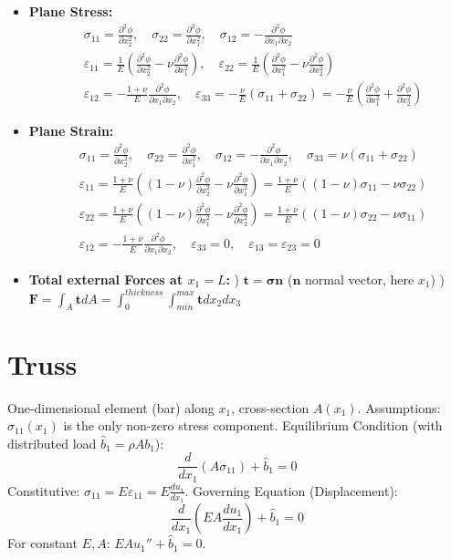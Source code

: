 \documentclass[10pt,twocolumn, a4paper]{article}
\begin{document}
\begin{itemize}
    \item \textbf{Plane Stress:}
    \begin{align*}
        &\sigma_{11} = \frac{\partial^2 \phi}{\partial x_2^2}, \quad \sigma_{22} = \frac{\partial^2 \phi}{\partial x_1^2}, \quad \sigma_{12} = -\frac{\partial^2 \phi}{\partial x_1 \partial x_2} \\
        &\varepsilon_{11} = \frac{1}{E}\left(\frac{\partial^2 \phi}{\partial x_2^2} - \nu \frac{\partial^2 \phi}{\partial x_1^2}\right), \quad \varepsilon_{22} = \frac{1}{E}\left(\frac{\partial^2 \phi}{\partial x_1^2} - \nu \frac{\partial^2 \phi}{\partial x_2^2}\right) \\
        &\varepsilon_{12} = -\frac{1+\nu}{E} \frac{\partial^2 \phi}{\partial x_1 \partial x_2}, \quad \varepsilon_{33} = -\frac{\nu}{E}(\sigma_{11} + \sigma_{22}) = -\frac{\nu}{E} \left(\frac{\partial^2 \phi}{\partial x_1^2} + \frac{\partial^2 \phi}{\partial x_2^2}\right)
    \end{align*}
    \item \textbf{Plane Strain:}
    \begin{align*}
        &\sigma_{11} = \frac{\partial^2 \phi}{\partial x_2^2}, \quad \sigma_{22} = \frac{\partial^2 \phi}{\partial x_1^2}, \quad \sigma_{12} = -\frac{\partial^2 \phi}{\partial x_1 \partial x_2}, \quad \sigma_{33} = \nu(\sigma_{11} + \sigma_{22}) \\
        &\varepsilon_{11} = \frac{1+\nu}{E}\left((1-\nu)\frac{\partial^2 \phi}{\partial x_2^2} - \nu \frac{\partial^2 \phi}{\partial x_1^2}\right) = \frac{1+\nu}{E} ((1-\nu)\sigma_{11} - \nu \sigma_{22}) \\
        &\varepsilon_{22} = \frac{1+\nu}{E}\left((1-\nu)\frac{\partial^2 \phi}{\partial x_1^2} - \nu \frac{\partial^2 \phi}{\partial x_2^2}\right) = \frac{1+\nu}{E} ((1-\nu)\sigma_{22} - \nu \sigma_{11}) \\
        &\varepsilon_{12} = -\frac{1+\nu}{E} \frac{\partial^2 \phi}{\partial x_1 \partial x_2}, \quad \varepsilon_{33} = 0, \quad \varepsilon_{13} = \varepsilon_{23} = 0
    \end{align*}
    \item \textbf{Total external Forces at $x_1=L$:} 
    ) $\bm{t} = \bm{\sigma} \bm{n}$ ($\bm{n}$ normal vector, here $x_1$) 
    ) $\bm{F} = \int_A \bm{t}dA = \int_0^{thickness} \int_{min}^{max} \bm{t} dx_2dx_3$
\end{itemize}

\section{Truss}
One-dimensional element (bar) along $x_1$, cross-section $A(x_1)$.
Assumptions: $\sigma_{11}(x_1)$ is the only non-zero stress component.
Equilibrium Condition (with distributed load $\hat{b}_1 = \rho A b_1$):
\[ \frac{d}{dx_1}(A \sigma_{11}) + \hat{b}_1 = 0 \]
Constitutive: $\sigma_{11} = E \varepsilon_{11} = E \frac{du_1}{dx_1}$.
Governing Equation (Displacement):
\[ \frac{d}{dx_1}\left( E A \frac{du_1}{dx_1} \right) + \hat{b}_1 = 0 \]
For constant $E, A$: $E A u_1'' + \hat{b}_1 = 0$.
\end{document}
